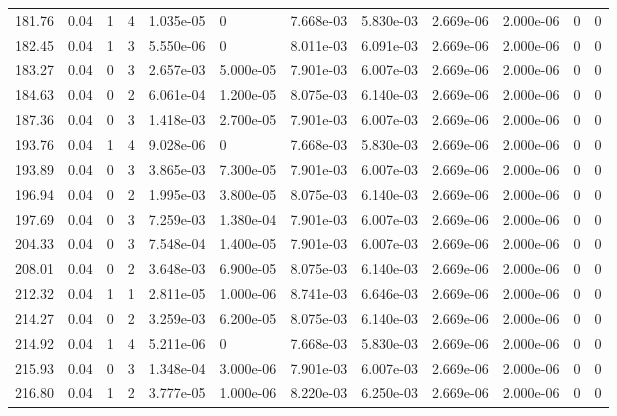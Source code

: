 \documentclass[preview]{standalone}
\begin{document}
{{{\begin{tabular}{L{1.2cm}C{1.2cm} C{0.3cm}C{0.5cm} C{1.4cm}C{1.4cm} C{1.4cm}C{1.4cm} C{1.6cm}C{1.6cm} C{1.6cm}C{1.6cm}}
  181.76  &  0.04  & 1     &  4 &  1.035e-05  & 0  &  7.668e-03&   5.830e-03& 2.669e-06 & 2.000e-06   &  0 & 0  \\ 
  182.45  &  0.04  & 1     &  3 &  5.550e-06  & 0  &  8.011e-03&   6.091e-03& 2.669e-06 & 2.000e-06   &  0 & 0  \\ 
  183.27  &  0.04  & 0     &  3 &  2.657e-03  & 5.000e-05  &  7.901e-03&   6.007e-03& 2.669e-06 & 2.000e-06   &  0 & 0  \\ 
  184.63  &  0.04  & 0     &  2 &  6.061e-04  & 1.200e-05  &  8.075e-03&   6.140e-03& 2.669e-06 & 2.000e-06   &  0 & 0  \\ 
  187.36  &  0.04  & 0     &  3 &  1.418e-03  & 2.700e-05  &  7.901e-03&   6.007e-03& 2.669e-06 & 2.000e-06   &  0 & 0  \\ 
  193.76  &  0.04  & 1     &  4 &  9.028e-06  & 0  &  7.668e-03&   5.830e-03& 2.669e-06 & 2.000e-06   &  0 & 0  \\ 
  193.89  &  0.04  & 0     &  3 &  3.865e-03  & 7.300e-05  &  7.901e-03&   6.007e-03& 2.669e-06 & 2.000e-06   &  0 & 0  \\ 
  196.94  &  0.04  & 0     &  2 &  1.995e-03  & 3.800e-05  &  8.075e-03&   6.140e-03& 2.669e-06 & 2.000e-06   &  0 & 0  \\ 
  197.69  &  0.04  & 0     &  3 &  7.259e-03  & 1.380e-04  &  7.901e-03&   6.007e-03& 2.669e-06 & 2.000e-06   &  0 & 0  \\ 
  204.33  &  0.04  & 0     &  3 &  7.548e-04  & 1.400e-05  &  7.901e-03&   6.007e-03& 2.669e-06 & 2.000e-06   &  0 & 0  \\ 
  208.01  &  0.04  & 0     &  2 &  3.648e-03  & 6.900e-05  &  8.075e-03&   6.140e-03& 2.669e-06 & 2.000e-06   &  0 & 0  \\ 
  212.32  &  0.04  & 1     &  1 &  2.811e-05  & 1.000e-06  &  8.741e-03&   6.646e-03& 2.669e-06 & 2.000e-06   &  0 & 0  \\ 
  214.27  &  0.04  & 0     &  2 &  3.259e-03  & 6.200e-05  &  8.075e-03&   6.140e-03& 2.669e-06 & 2.000e-06   &  0 & 0  \\ 
  214.92  &  0.04  & 1     &  4 &  5.211e-06  & 0  &  7.668e-03&   5.830e-03& 2.669e-06 & 2.000e-06   &  0 & 0  \\ 
  215.93  &  0.04  & 0     &  3 &  1.348e-04  & 3.000e-06  &  7.901e-03&   6.007e-03& 2.669e-06 & 2.000e-06   &  0 & 0  \\ 
  216.80  &  0.04  & 1     &  2 &  3.777e-05  & 1.000e-06  &  8.220e-03&   6.250e-03& 2.669e-06 & 2.000e-06   &  0 & 0  \\ 
\hline 
\end{tabular} 

}}}
\end{document}
